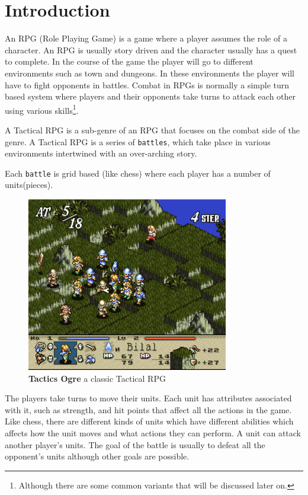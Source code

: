 
\section{Introduction} 
\label{introduction}
       
An RPG (Role Playing Game) is a game where a player assumes the role of a character. An RPG is usually story driven and the character usually has a quest to complete. In the course of the game the player will go to different environments such as town and dungeons. In these environments the player will have to fight opponents in battles. Combat in RPGs is normally a simple turn based system where players and their opponents take turns to attack each other using various skills\footnote{Although there are some common variants that will be discussed later on.}. 

A Tactical RPG is a sub-genre of an RPG that focuses on the combat side of the genre. A Tactical RPG is a series of \texttt{battles}, which take place in various environments intertwined with an over-arching story.

Each \texttt{battle} is grid based (like chess) where each player has a number of units(pieces). 
\begin{figure}[htbp] \centering 
	\includegraphics[height=3in]{figures/TRPG.png} 
	\caption{\textbf{Tactics Ogre}\cite{to} a classic Tactical RPG } 
	\label{fig:TRPG} 
\end{figure}
The players take turns to move their units. Each unit has attributes associated with it, such as strength, and hit points that affect all the actions in the game. Like chess, there are different kinds of units which have different abilities which affects how the unit moves and what actions they can perform. A unit can attack another player's units. The goal of the battle is usually to defeat all the opponent's units although other goals are possible.

